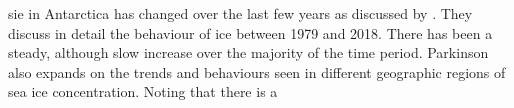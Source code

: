\gls{sie} in Antarctica has changed over the last few years as discussed by \cite{Parkinson2019}. They discuss in detail the behaviour of ice between 1979 and 2018. There has been a steady, although slow increase over the majority of the time period. Parkinson also expands on the trends and behaviours seen in different geographic regions of sea ice concentration. Noting that there is a 
